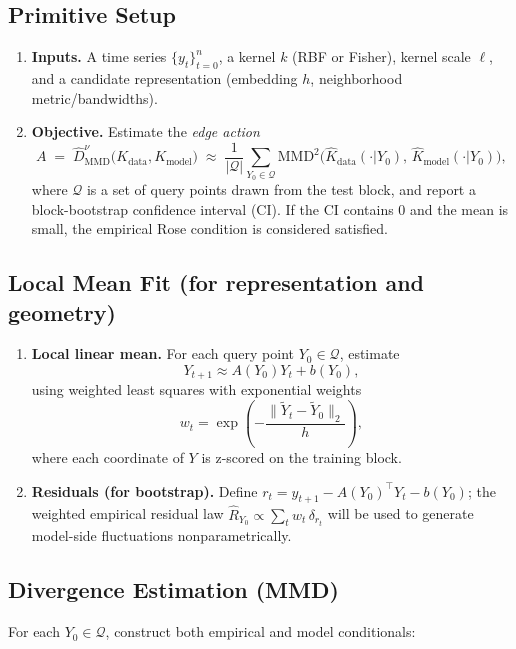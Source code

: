 \documentclass[11pt]{article}
\newcommand{\1}{\mathbf{1}}
\begin{document}
\subsection{Primitive Setup}
\begin{enumerate}
    \item \textbf{Inputs.} A time series $\{y_t\}_{t=0}^n$, a kernel $k$ (RBF or Fisher), kernel scale $\ell$, and a candidate representation (embedding $h$, neighborhood metric/bandwidths).
    \item \textbf{Objective.} Estimate the \emph{edge action}
    \[
        A \;=\; \widehat{D}_{\mathrm{MMD}}^\nu \big( K_{\mathrm{data}}, K_{\mathrm{model}} \big)
        \;\approx\; \frac{1}{|\mathcal Q|} \sum_{Y_0 \in \mathcal Q} 
        \mathrm{MMD}^2\!\big( \widehat K_{\mathrm{data}}(\cdot|Y_0),\,\widehat K_{\mathrm{model}}(\cdot|Y_0) \big),
    \]
    where $\mathcal Q$ is a set of query points drawn from the test block, and report a block-bootstrap confidence interval (CI). If the CI contains $0$ and the mean is small, the empirical Rose condition is considered satisfied.
\end{enumerate}

\subsection{Local Mean Fit (for representation and geometry)}
\begin{enumerate}
    \item \textbf{Local linear mean.} For each query point $Y_0 \in \mathcal Q$, estimate
    \[
        Y_{t+1} \approx A(Y_0) Y_t + b(Y_0),
    \]
    using weighted least squares with exponential weights
    \[
        w_t = \exp\!\left(-\frac{\| \widetilde Y_t - \widetilde Y_0\|_2}{h}\right),
    \]
    where each coordinate of $Y$ is z-scored on the training block.
    \item \textbf{Residuals (for bootstrap).} Define $r_t = y_{t+1} - A(Y_0)^\top Y_t - b(Y_0)$; the weighted empirical residual law
    \(
      \widehat R_{Y_0} \propto \sum_t w_t \,\delta_{r_t}
    \)
    will be used to generate model-side fluctuations nonparametrically.
\end{enumerate}

\subsection{Divergence Estimation (MMD)}
For each $Y_0 \in \mathcal Q$, construct both empirical and model conditionals:
\end{document}
